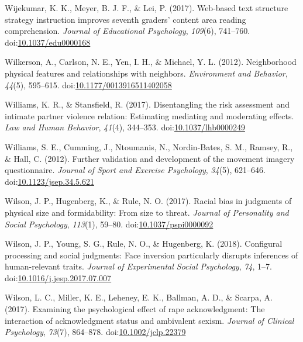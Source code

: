 \documentclass[english,man]{apa6}
\theoremstyle{definition}
\theoremstyle{definition}
\theoremstyle{definition}
\theoremstyle{remark}
\begin{document}
\hypertarget{ref-Wijekumar2017}{}
Wijekumar, K. K., Meyer, B. J. F., \& Lei, P. (2017). Web-based text
structure strategy instruction improves seventh graders' content area
reading comprehension. \emph{Journal of Educational Psychology},
\emph{109}(6), 741--760.
doi:\href{https://doi.org/10.1037/edu0000168}{10.1037/edu0000168}

\hypertarget{ref-Wilkerson2012}{}
Wilkerson, A., Carlson, N. E., Yen, I. H., \& Michael, Y. L. (2012).
Neighborhood physical features and relationships with neighbors.
\emph{Environment and Behavior}, \emph{44}(5), 595--615.
doi:\href{https://doi.org/10.1177/0013916511402058}{10.1177/0013916511402058}

\hypertarget{ref-Williams2017}{}
Williams, K. R., \& Stansfield, R. (2017). Disentangling the risk
assessment and intimate partner violence relation: Estimating mediating
and moderating effects. \emph{Law and Human Behavior}, \emph{41}(4),
344--353.
doi:\href{https://doi.org/10.1037/lhb0000249}{10.1037/lhb0000249}

\hypertarget{ref-Williams2012}{}
Williams, S. E., Cumming, J., Ntoumanis, N., Nordin-Bates, S. M.,
Ramsey, R., \& Hall, C. (2012). Further validation and development of
the movement imagery questionnaire. \emph{Journal of Sport and Exercise
Psychology}, \emph{34}(5), 621--646.
doi:\href{https://doi.org/10.1123/jsep.34.5.621}{10.1123/jsep.34.5.621}

\hypertarget{ref-Wilson2017a}{}
Wilson, J. P., Hugenberg, K., \& Rule, N. O. (2017). Racial bias in
judgments of physical size and formidability: From size to threat.
\emph{Journal of Personality and Social Psychology}, \emph{113}(1),
59--80.
doi:\href{https://doi.org/10.1037/pspi0000092}{10.1037/pspi0000092}

\hypertarget{ref-Wilson2018}{}
Wilson, J. P., Young, S. G., Rule, N. O., \& Hugenberg, K. (2018).
Configural processing and social judgments: Face inversion particularly
disrupts inferences of human-relevant traits. \emph{Journal of
Experimental Social Psychology}, \emph{74}, 1--7.
doi:\href{https://doi.org/10.1016/j.jesp.2017.07.007}{10.1016/j.jesp.2017.07.007}

\hypertarget{ref-Wilson2017}{}
Wilson, L. C., Miller, K. E., Leheney, E. K., Ballman, A. D., \& Scarpa,
A. (2017). Examining the psychological effect of rape acknowledgment:
The interaction of acknowledgment status and ambivalent sexism.
\emph{Journal of Clinical Psychology}, \emph{73}(7), 864--878.
doi:\href{https://doi.org/10.1002/jclp.22379}{10.1002/jclp.22379}
\end{document}

